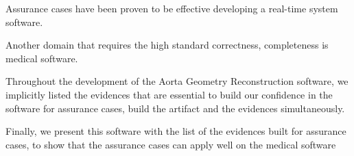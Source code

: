 
Assurance cases have been proven to be effective developing a real-time system software.

Another domain that requires the high standard correctness, completeness is medical software.

Throughout the development of the Aorta Geometry Reconstruction software, we implicitly listed the evidences that are essential to build our confidence in the software for assurance cases, build the artifact and the evidences simultaneously. 

Finally, we present this software with the list of the evidences built for assurance cases, to show that the assurance cases can apply well on the medical software